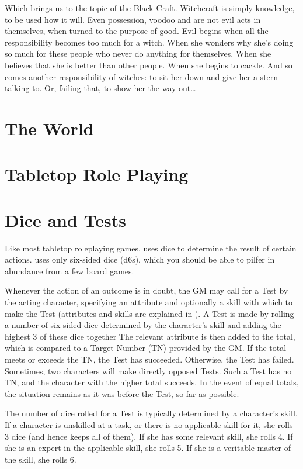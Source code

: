 Which brings us to the topic of the Black Craft.
Witchcraft is simply knowledge, to be used how it will.
Even possession, voodoo and  are not evil acts in themselves, when turned to the purpose of good. %
Evil begins when all the responsibility becomes too much for a witch.
When she wonders why she's doing so much for these people who never do anything for themselves.
When she believes that she is better than other people.
When she begins to cackle.
And so comes another responsibility of witches: to sit her down and give her a stern talking to.
Or, failing that, to show her the way out{\dots}

\section{The World}


\section{Tabletop Role Playing}

\section{Dice and Tests}

Like most tabletop roleplaying games,  uses dice to determine the result of certain actions.
 uses only six-sided dice (d6s), which you should be able to pilfer in abundance from a few board games.

Whenever the action of an outcome is in doubt, the GM may call for a Test by the acting character, specifying an attribute and optionally a skill with which to make the Test (attributes and skills are explained in ).
A Test is made by rolling a number of six-sided dice determined by the character's skill and adding the highest 3 of these dice together
The relevant attribute is then added to the total, which is compared to a Target Number (TN) provided by the GM.
If the total meets or exceeds the TN, the Test has succeeded.
Otherwise, the Test has failed.
Sometimes, two characters will make directly opposed Tests.
Such a Test has no TN, and the character with the higher total succeeds.
In the event of equal totals, the situation remains as it was before the Test, so far as possible.

The number of dice rolled for a Test is typically determined by a character's skill.
If a character is unskilled at a task, or there is no applicable skill for it, she rolls 3 dice (and hence keeps all of them).
If she has some relevant skill, she rolls 4.
If she is an expert in the applicable skill, she rolls 5.
If she is a veritable master of the skill, she rolls 6.

